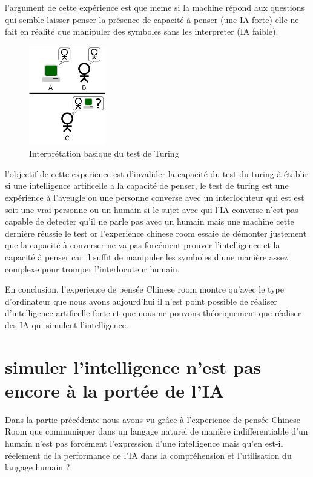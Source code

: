 l'argument de cette expérience est que meme si la machine répond aux questions qui semble laisser penser
la présence de capacité à penser (une IA forte) elle ne fait en réalité que manipuler des symboles
sans les interpreter (IA faible). \newline

\begin{figure}[h]
    \centering
    \includegraphics[width=0.3\textwidth]{Images/turingtest}
    \caption{Interprétation basique du test de Turing}
    \label{fig:turingtest}
\end{figure}

l'objectif de cette experience est d'invalider la capacité du test du turing à établir si une
intelligence artificelle a la capacité de penser, le test de turing est une expérience à l'aveugle
ou une personne converse avec un interlocuteur qui est est soit une vrai personne ou un humain
si le sujet avec qui l'IA converse n'est pas capable de detecter qu'il ne parle pas avec un humain mais
une machine cette dernière réussie le test or l'experience chinese room essaie de démonter
justement que la capacité à converser ne va pas forcément prouver l'intelligence et la capacité à penser
car il suffit de manipuler les symboles d'une manière assez complexe pour tromper l'interlocuteur humain.
\newline

En conclusion, l'experience de pensée Chinese room montre qu'avec le type d'ordinateur que
nous avons aujourd'hui il n'est point possible de réaliser d'intelligence artificelle forte
et que nous ne pouvons théoriquement que réaliser des IA qui simulent l'intelligence.

\section{simuler l'intelligence n'est pas encore à la portée de l'IA }

Dans la partie précédente nous avons vu grâce à l'experience de pensée Chinese Room que communiquer
dans un langage naturel de manière indifferentiable d'un humain n'est pas forcément l'expression d'une
intelligence mais qu'en est-il réelement de la performance de l'IA dans la compréhension et l'utilisation
du langage humain ? \newline

